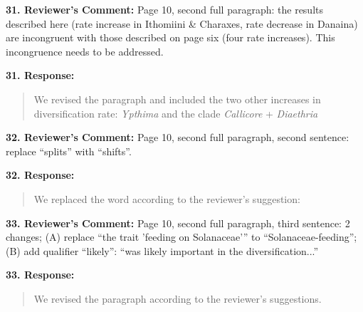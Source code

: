 \documentclass[]{article}
\begin{document}
\textbf{31. Reviewer's Comment:}
Page 10, second full paragraph: the results described here (rate increase in 
Ithomiini \& Charaxes, rate decrease in Danaina) are incongruent with those
described on page six (four rate increases). This incongruence needs to be 
addressed.

\textbf{31. Response:}
\begin{quote}
\color{blue}
We revised the paragraph and included the two other increases
in diversification rate: \emph{Ypthima} and the clade \emph{Callicore} + 
\emph{Diaethria}
\end{quote}


\textbf{32. Reviewer's Comment:}
Page 10, second full paragraph, second sentence: replace “splits” with “shifts”.

\textbf{32. Response:}
\begin{quote}
\color{blue}
We replaced the word according to the reviewer's suggestion:
\end{quote}


\textbf{33. Reviewer's Comment:}
Page 10, second full paragraph, third sentence: 2 changes; (A) replace “the
trait 'feeding on Solanaceae'” to “Solanaceae-feeding”; (B) add qualifier
“likely”: “was likely important in the diversification...”

\textbf{33. Response:}
\begin{quote}
\color{blue}
We revised the paragraph according to the reviewer's suggestions.
\end{quote}
\end{document}

